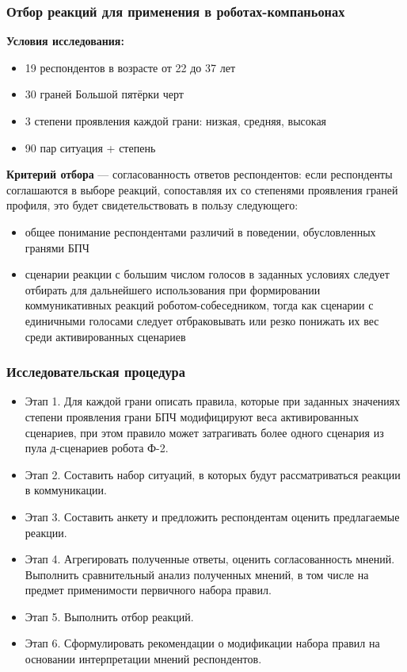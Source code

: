 \documentclass{beamer}
\begin{document}
\begin{frame}
    \frametitle{Отбор реакций для применения в роботах-компаньонах}

    \textbf{Условия исследования:}
    \begin{itemize}
        \item[---] 19 респондентов в возрасте от 22 до 37 лет
        \item[---] 30 граней Большой пятёрки черт
        \item[---] 3 степени проявления каждой грани: низкая, средняя, высокая
        \item[---] 90 пар \guillemotleft ситуация + степень\guillemotright{}
    \end{itemize}

    \vfill
    \textbf{Критерий отбора} --- согласованность ответов респондентов: если респонденты соглашаются в выборе реакций, сопоставляя их со степенями проявления граней профиля, это будет свидетельствовать в пользу следующего:
    \begin{itemize}
        \item[---] общее понимание респондентами различий в поведении, обусловленных гранями БПЧ
        \item[---] сценарии реакции с большим числом голосов в заданных условиях следует отбирать для дальнейшего использования при формировании коммуникативных реакций роботом-собеседником, тогда как сценарии с единичными голосами следует отбраковывать или резко понижать их вес среди активированных сценариев
    \end{itemize}
\end{frame}


\begin{frame}
    \frametitle{Исследовательская процедура}
    \begin{itemize}
	\item Этап 1. Для каждой грани описать правила, которые при заданных значениях степени проявления грани БПЧ модифицируют веса активированных сценариев, при этом правило может затрагивать более одного сценария из пула д-сценариев робота Ф-2.
	\item Этап 2. Составить набор ситуаций, в которых будут рассматриваться реакции в коммуникации.
	\item Этап 3. Составить анкету и предложить респондентам оценить предлагаемые реакции.
	\item Этап 4. Агрегировать полученные ответы, оценить согласованность мнений. Выполнить сравнительный анализ полученных мнений, в том числе на предмет применимости первичного набора правил.
	\item Этап 5. Выполнить отбор реакций.
	\item Этап 6. Сформулировать рекомендации о модификации набора правил на основании интерпретации мнений респондентов.
\end{itemize}
\end{frame}
\end{document}
